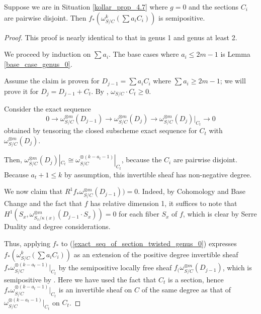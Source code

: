 \begin{lemma}\label{inductive_step_genus_0}
Suppose we are in Situation \ref{kollar_prop_4.7} where $g=0$ and the sections $C_i$ are pairwise disjoint.
Then $f_{*}(\omega_{S/C}^{k}(\sum a_iC_i))$ is semipositive.
\end{lemma}
\begin{proof}
This proof is nearly identical to that in genus 1 and genus at least 2.

We proceed by induction on $\sum a_i$. 
The base cases where $a_i\le 2m-1$ is Lemma \ref{base_case_genus_0}.

Assume the claim is proven for $D_{j-1}=\sum a_iC_i$ where $\sum a_i\ge 2m-1$; we will prove it for $D_{j}=D_{j-1}+C_t$.
By , $\omega_{S/C}\cdot C_t\ge0$.

Consider the exact sequence
\begin{equation*}\label{exact_seq_of_section_twisted_genus_0}
0\to\omega_{S/C}^{\otimes m}(D_{j-1})\to\omega_{S/C}^{\otimes m}(D_j)\to \omega_{S/C}^{\otimes m}(D_j)|_{C_t}\to0
\end{equation*}
obtained by tensoring the closed subscheme exact sequence for $C_t$ with $\omega_{S/C}^{\otimes m}(D_j)$.

Then, $\omega_{S/C}^{\otimes m}(D_j)|_{C_t}\cong \omega_{S/C}^{\otimes (k-a_{t}-1)}|_{C_t}$, because the $C_i$ are pairwise disjoint.
Because $a_{t}+1\le k$ by assumption, this invertible sheaf has non-negative degree.

We now claim that $R^{1}f_{*}\omega_{S/C}^{\otimes m}(D_{j-1}))=0$.
Indeed, by Cohomology and Base Change and the fact that $f$ has relative dimension 1, it suffices to note that $H^{1}(S_x,\omega_{S_x/\kappa(x)}^{\otimes m}(D_{j-1}\cdot S_x))=0$ for each fiber $S_x$ of $f$, which is clear by Serre Duality and degree considerations.

Thus, applying $f_{*}$ to (\ref{exact_seq_of_section_twisted_genus_0}) expresses $f_{*}(\omega_{S/C}^{k}(\sum a_iC_i))$ as an extension of the positive degree invertible sheaf $f_{*}\omega_{S/C}^{\otimes (k-a_{t}-1)}|_{C_t}$ by the semipositive locally free sheaf $f_{(}\omega_{S/C}^{\otimes m}(D_{j-1})$, which is semipositive by .
Here we have used the fact that $C_t$ is a section, hence $f_{*}\omega_{S/C}^{\otimes (k-a_{t}-1)}|_{C_t}$ is an invertible sheaf on $C$ of the same degree as that of $\omega_{S/C}^{\otimes (k-a_{t}-1)}|_{C_t}$ on $C_t$.
\end{proof}

